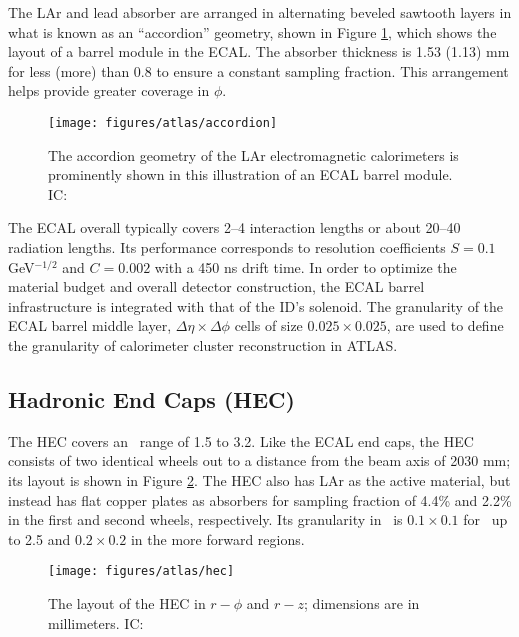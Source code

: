 The LAr and lead absorber are arranged in alternating beveled sawtooth layers in what is known as an ``accordion'' geometry, shown in Figure \ref{fig:accordion}, which shows the layout of a barrel module in the ECAL.  The absorber thickness is 1.53 (1.13) mm for \aeta less (more) than 0.8 to ensure a constant sampling fraction.  This arrangement helps provide greater coverage in $\phi$.
\begin{figure}[!htbp]\captionsetup{justification=centering}
  \centering
  \texttt{[image: figures/atlas/accordion]}
  \caption{The accordion geometry of the LAr electromagnetic calorimeters is prominently shown in this illustration of an ECAL barrel module.  IC: \cite{jinstpaper}}
  \label{fig:accordion}
\end{figure}

The ECAL overall typically covers 2--4 interaction lengths or about 20--40 radiation lengths.  Its performance corresponds to resolution coefficients $S=0.1$ GeV$^{-1/2}$ and $C=0.002$ with a 450 ns drift time.  In order to optimize the material budget and overall detector construction, the ECAL barrel infrastructure is integrated with that of the ID's solenoid.  The granularity of the ECAL barrel middle layer, $\Delta\eta\times\Delta\phi$ cells of size $0.025\times0.025$, are used to define the granularity of calorimeter cluster reconstruction in ATLAS.

\subsection{Hadronic End Caps (HEC)}
The HEC covers an \aeta \, range of 1.5 to 3.2.  Like the ECAL end caps, the HEC consists of two identical wheels out to a distance from the beam axis of 2030 mm; its layout is shown in Figure \ref{fig:hec}.  The HEC also has LAr as the active material, but instead has flat copper plates as absorbers for sampling fraction of 4.4\% and 2.2\% in the first and second wheels, respectively.  Its granularity in \ephi\, is $0.1\times0.1$ for \aeta\, up to 2.5 and $0.2\times0.2$ in the more forward regions.

\begin{figure}[!htbp]\captionsetup{justification=centering}
  \centering
  \texttt{[image: figures/atlas/hec]}
  \caption{The layout of the HEC in $r-\phi$ and $r-z$; dimensions are in millimeters.  IC: \cite{jinstpaper}}
  \label{fig:hec}
\end{figure}


